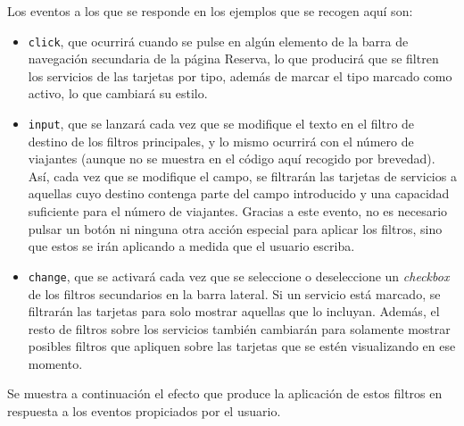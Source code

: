 \documentclass[11pt, a4paper]{book}
\begin{document}
    Los eventos a los que se responde en los ejemplos que se recogen aquí son:
    \begin{itemize}
        \item \texttt{click}, que ocurrirá cuando se pulse en algún elemento de la barra de navegación secundaria de la página Reserva, lo que producirá que se filtren los servicios de las tarjetas por tipo, además de marcar el tipo marcado como activo, lo que cambiará su estilo. 
        \item \texttt{input}, que se lanzará cada vez que se modifique el texto en el filtro de destino de los filtros principales, y lo mismo ocurrirá con el número de viajantes (aunque no se muestra en el código aquí recogido por brevedad). Así, cada vez que se modifique el campo, se filtrarán las tarjetas de servicios a aquellas cuyo destino contenga parte del campo introducido y una capacidad suficiente para el número de viajantes. Gracias a este evento, no es necesario pulsar un botón ni ninguna otra acción especial para aplicar los filtros, sino que estos se irán aplicando a medida que el usuario escriba.
        \item \texttt{change}, que se activará cada vez que se seleccione o deseleccione un \textit{checkbox} de los filtros secundarios en la barra lateral. Si un servicio está marcado, se filtrarán las tarjetas para solo mostrar aquellas que lo incluyan. Además, el resto de filtros sobre los servicios también cambiarán para solamente mostrar posibles filtros que apliquen sobre las tarjetas que se estén visualizando en ese momento.
    \end{itemize}

    Se muestra a continuación el efecto que produce la aplicación de estos filtros en respuesta a los eventos propiciados por el usuario.
\end{document}
